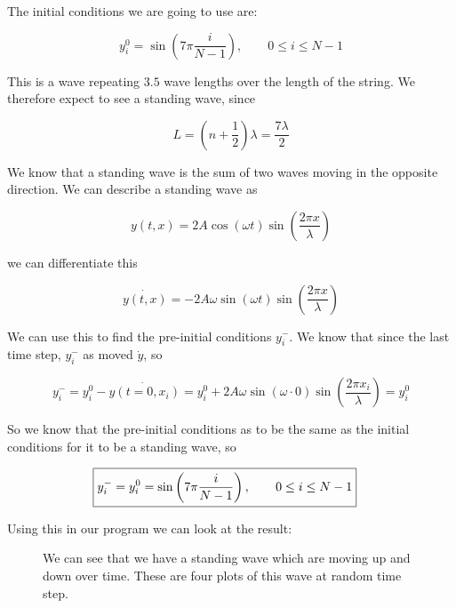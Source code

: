 \documentclass[a4paper,norsk, 10pt]{article}
\begin{document}
The initial conditions we are going to use are:

\begin{equation}
y_i^0 = \sin\left(7\pi \frac{i}{N-1}\right), \qquad 0\leq i \leq N-1
\label{eq:initSin}
\end{equation}

This is a wave repeating $3.5$ wave lengths over the length of the string. We therefore expect to see a standing wave, since

\begin{equation}
L = \left(n + \frac{1}{2}\right)\lambda = \frac{7\lambda}{2}
\end{equation}

We know that a standing wave is the sum of two waves moving in the opposite direction. We can describe a standing wave as 

\begin{equation}
y(t,x) = 2A\cos(\omega t)\sin\left(\frac{2\pi x}{\lambda}\right)
\end{equation}

we can differentiate this

\begin{equation}
\dot{y(t,x)} =  -2A\omega\sin(\omega t)\sin\left(\frac{2\pi x}{\lambda}\right)
\end{equation}

We can use this to find the pre-initial conditions $y_i^-$. We know that since the last time step, $y_i^-$ as moved $\dot{y}$, so

\begin{equation}
y_i^- = y_i^0 - \dot{y(t=0,x_i)} = y_i^0 +2A\omega\sin(\omega \cdot 0)\sin\left(\frac{2\pi x_i}{\lambda}\right) = y_i^0
\end{equation}

So we know that the pre-initial conditions as to be the same as the initial conditions for it to be a standing wave, so

\begin{align}
\Aboxed{
y_i^- = y_i^0 = \sin\left(7\pi \frac{i}{N-1}\right), \qquad 0\leq i \leq N-1
}
\end{align}

Using this in our program we can look at the result:

\begin{figure}[H]
\captionsetup[subfigure]{position=b}
\centering
{}
\caption{We can see that we have a standing wave which are moving up and down over time. These are four plots of this wave at random time step.}
\end{figure}
\end{document}
